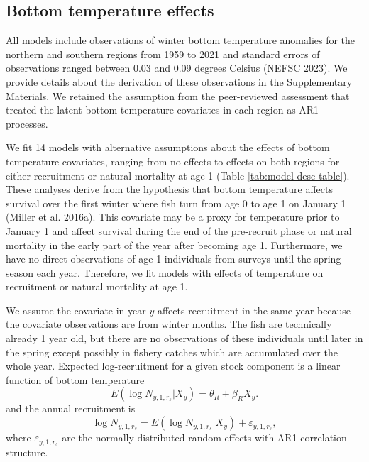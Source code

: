 \documentclass[
]{article}
\begin{document}
\hypertarget{bottom-temperature-effects}{%
\subsection*{Bottom temperature effects}\label{bottom-temperature-effects}}

All models include observations of winter bottom temperature anomalies for the northern and southern regions from 1959 to 2021 and standard errors of observations ranged between 0.03 and 0.09 degrees Celsius (NEFSC 2023). We provide details about the derivation of these observations in the Supplementary Materials. We retained the assumption from the peer-reviewed assessment that treated the latent bottom temperature covariates in each region as AR1 processes.

We fit 14 models with alternative assumptions about the effects of bottom temperature covariates, ranging from no effects to effects on both regions for either recruitment or natural mortality at age 1 (Table \ref{tab:model-desc-table}). These analyses derive from the hypothesis that bottom temperature affects survival over the first winter where fish turn from age 0 to age 1 on January 1 (Miller et al. 2016a). This covariate may be a proxy for temperature prior to January 1 and affect survival during the end of the pre-recruit phase or natural mortality in the early part of the year after becoming age 1. Furthermore, we have no direct observations of age 1 individuals from surveys until the spring season each year. Therefore, we fit models with effects of temperature on recruitment or natural mortality at age 1.

We assume the covariate in year \(y\) affects recruitment in the same year because the covariate observations are from winter months. The fish are technically already 1 year old, but there are no observations of these individuals until later in the spring except possibly in fishery catches which are accumulated over the whole year. Expected log-recruitment for a given stock component is a linear function of bottom temperature
\begin{equation}\label{eq:expected-recruitment}
E\left(\log N_{y,1,r_s}|X_{y}\right) = \theta_{R} + \beta_{R} X_y.
\end{equation}
and the annual recruitment is
\begin{equation}\label{eq:Rec-re}
\log N_{y,1,r_s} = E\left(\log N_{y,1,r_s}|X_y\right) + \varepsilon_{y,1,r_s},
\end{equation}
where \(\varepsilon_{y,1,r_s}\) are the normally distributed random effects with AR1 correlation structure.
\end{document}
